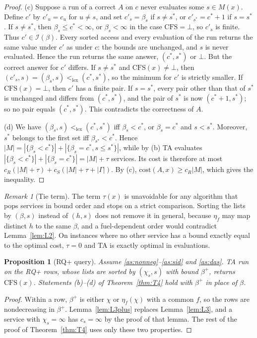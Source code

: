 \documentclass[11pt]{article}
\newtheorem{proposition}[theorem]{Proposition}
\theoremstyle{definition}
\theoremstyle{remark}
\newtheorem{remark}[theorem]{Remark}
\newcommand{\lexlt}{\mathrel{<_{\mathrm{lex}}}}
\newcommand{\cfs}{\mathrm{CFS}}
\begin{document}
\begin{proof}
(c) Suppose a run of a correct $A$ on $c$ never evaluates some $s\in M(x)$. Define $c'$ by
$c'_u=c_u$ for $u\ne s$, and set $c'_s=\beta_s$ if $s\ne s^*$, or $c'_{s^*}=c^*+1$ if $s=s^*$. If
$s\ne s^*$, then $\beta_s\le c^*<\infty$, or $\beta_s<\infty$ in the case $\cfs=\bot$, so $c'_s$ is
finite. Thus $c'\in\mathcal I(\beta)$. Every sorted access and every evaluation of the run
returns the same value under $c'$ as under $c$: the bounds are unchanged, and $s$ is never
evaluated. Hence the run returns the same answer, $(c^*,s^*)$ or $\bot$. But the correct
answer for $c'$ differs. If $s\ne s^*$ and $\cfs(x)\ne\bot$, then
$(c'_s,s)=(\beta_s,s)\lexlt(c^*,s^*)$, so the minimum for $c'$ is strictly smaller. If
$\cfs(x)=\bot$, then $c'$ has a finite pair. If $s=s^*$, every pair other than that of $s^*$
is unchanged and differs from $(c^*,s^*)$, and the pair of $s^*$ is now $(c^*+1,s^*)$; so no
pair equals $(c^*,s^*)$. This contradicts the correctness of $A$.

(d) We have $(\beta_s,s)\lexlt(c^*,s^*)$ iff $\beta_s<c^*$, or $\beta_s=c^*$ and $s<s^*$. Moreover,
$s^*$ belongs to the first set iff $\beta_{s^*}<c^*$. Hence
$|M|=|\{\beta_s<c^*\}|+|\{\beta_s=c^*,s\le s^*\}|$, while by (b) TA evaluates
$|\{\beta_s<c^*\}|+|\{\beta_s=c^*\}|=|M|+\tau$ services. Its cost is therefore at most
$c_R(|M|+\tau)+c_S(|M|+\tau+|\Gamma|)$. By (c), $\mathrm{cost}(A,x)\ge c_R|M|$, which gives
the inequality.
\end{proof}

\begin{remark}[Tie term]
The term $\tau(x)$ is unavoidable for any algorithm that pops services in bound order and
stops on a strict comparison. Sorting the lists by $(\beta,s)$ instead of $(h,s)$ does not
remove it in general, because $\eta_f$ may map distinct $h$ to the same $\beta$, and a
fuel-dependent order would contradict Lemma~\ref{lem:L2}. On instances where no other
service has a bound exactly equal to the optimal cost, $\tau=0$ and TA is exactly optimal
in evaluations.
\end{remark}

\begin{proposition}[RQ+ query]\label{prop:rqplus}
Assume \ref{as:nonneg}--\ref{as:sid} and \ref{as:das}. TA run on the RQ+ rows, whose lists are
sorted by $(\chi_s,s)$ with bound $\beta^+$, returns $\cfs(x)$. Statements (b)--(d) of
Theorem~\ref{thm:T4} hold with $\beta^+$ in place of $\beta$.
\end{proposition}
\begin{proof}
Within a row, $\beta^+$ is either $\chi$ or $\eta_f(\chi)$ with a common $f$, so the rows are
nondecreasing in $\beta^+$. Lemma~\ref{lem:L3plus} replaces Lemma~\ref{lem:L3}, and a
service with $\chi_s=\infty$ has $c_s=\infty$ by the proof of that lemma. The rest of the
proof of Theorem~\ref{thm:T4} uses only these two properties.
\end{proof}
\end{document}
